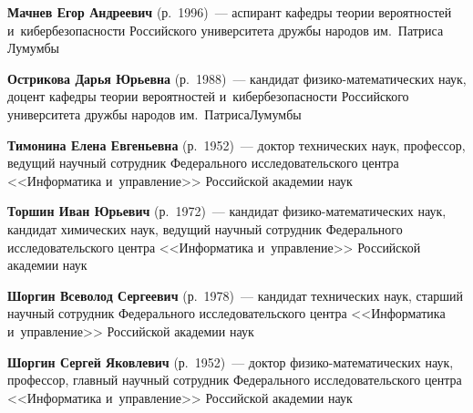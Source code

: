 \begin{multicols}{2}
\pagebreak

\noindent
\textbf{Мачнев Егор Андреевич} (р.\ 1996)~--- аспирант ка\-фед\-ры тео\-рии вероятностей и~ки\-бер\-безопас\-ности 
Российского университета дружбы народов им.\ Пат\-ри\-са Лумумбы

\vspace*{6pt}

\noindent
\textbf{Острикова Дарья Юрьевна} (р.\ 1988)~--- кандидат фи\-зи\-ко-ма\-те\-ма\-ти\-че\-ских наук, 
доцент кафедры тео\-рии вероятностей и~ки\-бер\-безопас\-ности Российского университета дружбы народов им.\ Пат\-ри\-са\linebreak Лумумбы

\vspace*{6pt}

\noindent
\textbf{Тимонина Елена Евгеньевна} (р.\ 1952)~--- 
доктор технических наук, профессор, ведущий научный сотрудник Федерального исследовательского цент\-ра <<Информатика и~управ\-ле\-ние>>
 Российской академии наук
 
\columnbreak
 
\noindent
\textbf{Торшин Иван Юрьевич} (р.\ 1972)~--- кандидат фи\-зи\-ко-ма\-те\-ма\-ти\-че\-ских наук, 
кандидат химических наук, ведущий научный сотрудник Федерального исследовательского цент\-ра <<Информатика и~управ\-ле\-ние>>
 Российской академии наук
 
 
 \vspace*{6pt}

\noindent
\textbf{Шоргин Всеволод Сергеевич} (р.\ 1978)~--- 
кандидат технических наук, старший научный сотрудник Федерального исследовательского цент\-ра <<Информатика и~управ\-ле\-ние>> Российской академии наук


\vspace*{6pt}

\noindent
\textbf{Шоргин Сергей Яковлевич} (р.\ 1952)~--- доктор фи\-зи\-ко-ма\-те\-ма\-ти\-че\-ских наук, профессор, главный научный сотрудник 
Федерального исследовательского центра  <<Информатика и~управ\-ле\-ние>> Российской академии наук









\def\leftkol{ОБ АВТОРАХ}

\def\rightkol{ОБ АВТОРАХ}


 \label{end\stat}



\end{multicols}

\def\leftkol{ОБ АВТОРАХ}
\def\rightkol{ОБ АВТОРАХ}

\newpage